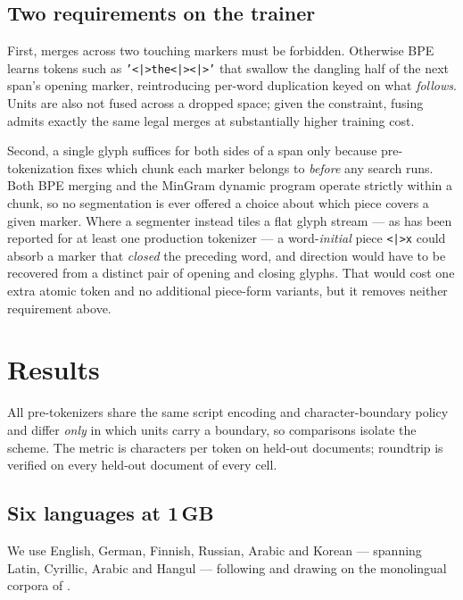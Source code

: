 \documentclass[11pt]{article}
\newcommand{\mk}{\texttt{<|>}}
\begin{document}
\subsection{Two requirements on the trainer}
\label{sec:onemarker}

First, merges across two touching markers must be forbidden. Otherwise BPE learns tokens
such as \texttt{'\mk{}the\mk{}\mk{}'} that swallow the dangling half of the next span's
opening marker, reintroducing per-word duplication keyed on what \emph{follows}. Units are
also not fused across a dropped space; given the constraint, fusing admits exactly the same
legal merges at substantially higher training cost.

Second, a single glyph suffices for both sides of a span only because pre-tokenization fixes
which chunk each marker belongs to \emph{before} any search runs. Both BPE merging and the
MinGram dynamic program operate strictly within a chunk, so no segmentation is ever offered
a choice about which piece covers a given marker. Where a segmenter instead tiles a flat
glyph stream --- as has been reported for at least one production tokenizer
\citep{tokencontributions-claude} --- a word-\emph{initial} piece \texttt{\mk{}x} could
absorb a marker that \emph{closed} the preceding word, and direction would have to be
recovered from a distinct pair of opening and closing glyphs. That would cost one extra
atomic token and no additional piece-form variants, but it removes neither requirement
above.

\section{Results}
\label{sec:results}

All pre-tokenizers share the same script encoding and character-boundary policy and differ
\emph{only} in which units carry a boundary, so comparisons isolate the scheme. The metric
is characters per token on held-out documents; roundtrip is verified on every held-out
document of every cell.

\subsection{Six languages at 1\,GB}
\label{sec:multiling}

We use English, German, Finnish, Russian, Arabic and Korean --- spanning Latin, Cyrillic,
Arabic and Hangul --- following
\citet{land2025piecesdoesunigramtokenization,land2026mingram} and drawing on the monolingual
corpora of \citet{chang2026goldfishmonolinguallanguagemodels}.
\end{document}
